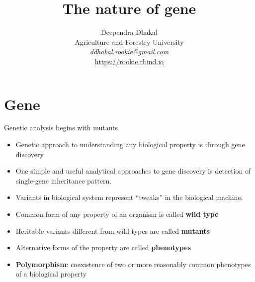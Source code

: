 \documentclass[11pt,dvipsnames,ignorenonframetext,aspectratio=169]{beamer}
\title[]{The nature of gene}
\author[
        Deependra Dhakal\\
Agriculture and Forestry University\\
\textit{ddhakal.rookie@gmail.com}\\
\url{https://rookie.rbind.io}
    ]{Deependra Dhakal\\
Agriculture and Forestry University\\
\textit{ddhakal.rookie@gmail.com}\\
\url{https://rookie.rbind.io}}
\date[
      
  ]{
    }
\providecommand{\tightlist}{%
  \setlength{\itemsep}{0pt}\setlength{\parskip}{0pt}}
\begin{document}
  \begin{frame}[plain]
  \titlepage
  \end{frame}



\hypertarget{gene}{%
\section{Gene}\label{gene}}

\begin{frame}{Genetic analysis begins with mutants}
\protect\hypertarget{genetic-analysis-begins-with-mutants}{}
\begin{itemize}
\tightlist
\item
  Genetic approach to understanding any biological property is through
  gene discovery
\item
  One simple and useful analytical approaches to gene discovery is
  detection of single-gene inheritance pattern.
\item
  Variants in biological system represent ``tweaks'' in the biological
  machine.
\item
  Common form of any property of an organism is called \textbf{wild
  type}
\item
  Heritable variants different from wild types are called
  \textbf{mutants}
\item
  Alternative forms of the property are called \textbf{phenotypes}
\item
  \textbf{Polymorphism}: coexistence of two or more reasonably common
  phenotypes of a biological property
\end{itemize}
\end{frame}
\end{document}
